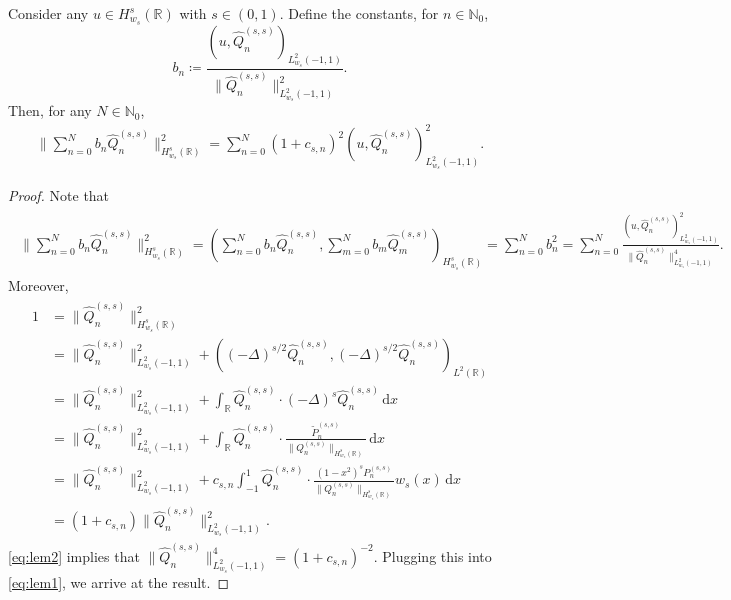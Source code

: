 \documentclass[10pt,a4paper]{amsart}
\newcommand{\dx}{\mathrm{d}x}
\begin{document}
\begin{lemma}
\label{lem:b}
Consider any $u \in H^s_{w_s}(\mathbb{R})$ with $s \in (0,1)$. Define the constants, for $n \in \mathbb{N}_0$, 
\[
b_n \coloneqq \frac{(u, \hat{Q}_n^{(s,s)})_{L^2_{w_s}(-1,1)}}{\|\hat{Q}_n^{(s,s)}\|^2_{L^2_{w_s}(-1,1)}}.
\]
Then, for any $N \in \mathbb{N}_0$,
\begin{align}
\| \sum_{n=0}^N b_n \hat{Q}_n^{(s,s)}\|^2_{H^s_{w_s}(\mathbb{R})} = \sum_{n=0}^N (1+c_{s,n})^2 (u, \hat{Q}_n^{(s,s)})^2_{L^2_{w_s}(-1,1)}.
\end{align}
\end{lemma}

\begin{proof}
Note that
\begin{align}
\begin{split}
\| \sum_{n=0}^N b_n \hat{Q}_n^{(s,s)}\|^2_{H^s_{w_s}(\mathbb{R})} 
 = (\sum_{n=0}^N b_n \hat{Q}_n^{(s,s)}, \sum_{m=0}^N b_m \hat{Q}_m^{(s,s)})_{H^s_{w_s}(\mathbb{R})} 
= \sum_{n=0}^N b_n^2 
= \sum_{n=0}^N \frac{(u, \hat{Q}_n^{(s,s)})^2_{L^2_{w_s}(-1,1)}}{\|\hat{Q}_n^{(s,s)}\|^4_{L^2_{w_s}(-1,1)}}.
\label{eq:lem1}
\end{split}
\end{align}
Moreover,
\begin{align}
\begin{split}
1 
&= \| \hat{Q}^{(s,s)}_n \|^2_{H^s_{w_s}(\mathbb{R})} \\
& = \|\hat{Q}^{(s,s)}_n\|^2_{L^2_{w_s}(-1,1)} + ((-\Delta)^{s/2} \hat{Q}_n^{(s,s)}, (-\Delta)^{s/2}\hat{Q}_n^{(s,s)})_{L^2(\mathbb{R})} \\
&=  \|\hat{Q}^{(s,s)}_n\|^2_{L^2_{w_s}(-1,1)} + \int_{\mathbb{R}} \hat{Q}_n^{(s,s)} \cdot (-\Delta)^{s} \hat{Q}_n^{(s,s)}\, \dx\\
&=  \|\hat{Q}^{(s,s)}_n\|^2_{L^2_{w_s}(-1,1)} + \int_{\mathbb{R}} \hat{Q}_n^{(s,s)} \cdot  \frac{{\tilde P}_n^{(s,s)}}{\|{Q}_n^{(s,s)}\|_{H^s_{w_s}(\mathbb{R})}}\, \dx\\
&=\|\hat{Q}^{(s,s)}_n\|^2_{L^2_{w_s}(-1,1)} + c_{s,n} \int_{-1}^1 \hat{Q}^{(s,s)}_n \cdot  \frac{(1-x^2)^s {P}_n^{(s,s)}}{\|{Q}_n^{(s,s)}\|_{H^s_{w_s}(\mathbb{R})}} w_s(x) \, \dx\\
&= (1+c_{s,n})  \|\hat{Q}^{(s,s)}_n\|^2_{L^2_{w_s}(-1,1)}.
\label{eq:lem2}
\end{split}
\end{align}
\cref{eq:lem2} implies that $ \|\hat{Q}^{(s,s)}_n\|^4_{L^2_{w_s}(-1,1)} = (1+c_{s,n})^{-2}$. Plugging this into \cref{eq:lem1}, we arrive at the result.
\end{proof}
\end{document}
